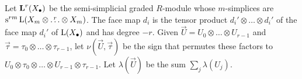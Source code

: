 



Let $\AA^r(X_\bullet)$ be the semi-simplicial graded $R$-module whose $m$-simplices are $\sus{rm}\rA(X_m\otimes \overset{r}{\ldots}\otimes X_m)$. The face map $d_i$ is the tensor product $d_i'\otimes \ldots\otimes d_i'$ of the face map $d_i'$ of $\rA(X_\bullet)$ and has degree $-r$. Given $\vec{U} = U_0\otimes \ldots\otimes U_{r-1}$ and $\vec{\tau} = \tau_0\otimes\ldots\otimes \tau_{r-1}$, let $\nu(\vec{U},\vec{\tau})$ be the sign that permutes these factors to $U_0\otimes \tau_0\otimes\ldots\otimes U_{r-1}\otimes \tau_{r-1}$. Let $\lambda(\vec{U})$ be the sum $\sum_j\lambda(U_j)$.

